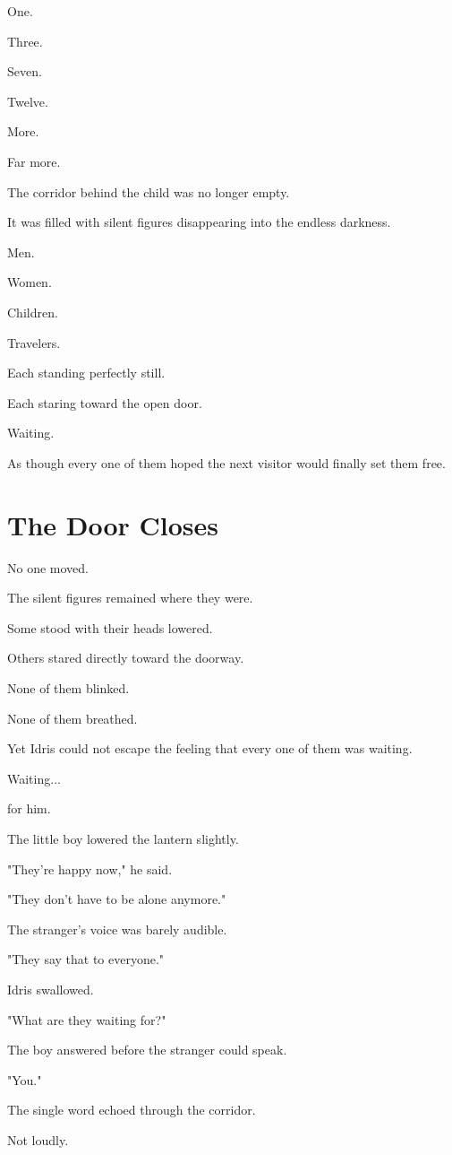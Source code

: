 \documentclass[12pt,openany]{book}
\begin{document}
One.

Three.

Seven.

Twelve.

More.

Far more.

The corridor behind the child was no longer empty.

It was filled with silent figures disappearing into the endless darkness.

Men.

Women.

Children.

Travelers.

Each standing perfectly still.

Each staring toward the open door.

Waiting.

As though every one of them hoped the next visitor would finally set them free.
\section*{The Door Closes}

No one moved.

The silent figures remained where they were.

Some stood with their heads lowered.

Others stared directly toward the doorway.

None of them blinked.

None of them breathed.

Yet Idris could not escape the feeling that every one of them was waiting.

Waiting...

for him.

The little boy lowered the lantern slightly.

"They're happy now," he said.

"They don't have to be alone anymore."

The stranger's voice was barely audible.

"They say that to everyone."

Idris swallowed.

"What are they waiting for?"

The boy answered before the stranger could speak.

"You."

The single word echoed through the corridor.

Not loudly.
\end{document}
